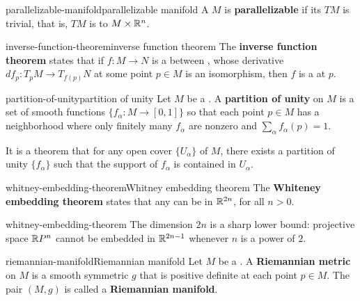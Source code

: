 \begin{topic}{parallelizable-manifold}{parallelizable manifold}
    A  $M$ is \textbf{parallelizable} if its  $TM$ is trivial, that is, $TM$ is  to $M \times \mathbb{R}^n$.
\end{topic}

\begin{topic}{inverse-function-theorem}{inverse function theorem}
    The \textbf{inverse function theorem} states that if $f : M \to N$ is a  between , whose derivative $df_p : T_p M \to T_{f(p)} N$ at some point $p \in M$ is an isomorphism, then $f$ is a  at $p$.
\end{topic}

\begin{topic}{partition-of-unity}{partition of unity}
    Let $M$ be a . A \textbf{partition of unity} on $M$ is a set of smooth functions $\{ f_\alpha : M \to [0, 1] \}$ so that each point $p \in M$ has a neighborhood where only finitely many $f_\alpha$ are nonzero and $\sum_\alpha f_\alpha(p) = 1$.
    
    It is a theorem that for any open cover $\{ U_\alpha \}$ of $M$, there exists a partition of unity $\{ f_\alpha \}$ such that the support of $f_\alpha$ is contained in $U_\alpha$.
\end{topic}

\begin{topic}{whitney-embedding-theorem}{Whitney embedding theorem}
    The \textbf{Whiteney embedding theorem} states that any  can be  in $\mathbb{R}^{2n}$, for all $n > 0$.
\end{topic}

\begin{example}{whitney-embedding-theorem}
    The dimension $2n$ is a sharp lower bound: projective space $\mathbb{R} P^n$ cannot be embedded in $\mathbb{R}^{2n - 1}$ whenever $n$ is a power of $2$.
\end{example}

\begin{topic}{riemannian-manifold}{Riemannian manifold}
    Let $M$ be a . A \textbf{Riemannian metric} on $M$ is a smooth symmetric  $g$ that is positive definite at each point $p \in M$. The pair $(M, g)$ is called a \textbf{Riemannian manifold}.
\end{topic}

